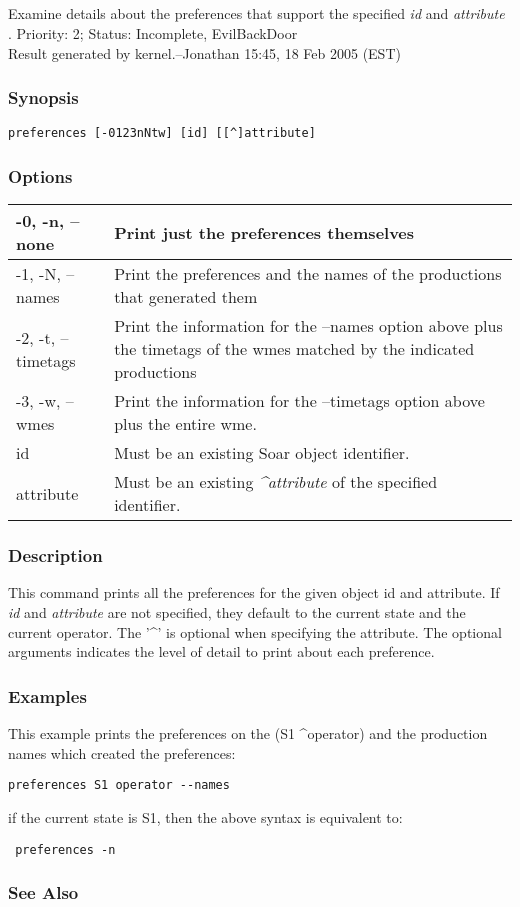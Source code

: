 \subsection{}
\label{preferences}
Examine details about the preferences that support the specified \emph{id}
 and \emph{attribute}
. 
 Priority: 2; Status: Incomplete, EvilBackDoor\\ 
Result generated by kernel.--Jonathan 15:45, 18 Feb 2005 (EST) 
\subsubsection*{Synopsis}
\begin{verbatim}
preferences [-0123nNtw] [id] [[^]attribute]
\end{verbatim}
\subsubsection*{Options}
\begin{tabular}{|l|l|}
\hline 
 -0, -n, --none  & Print just the preferences themselves  \\
 \hline 
 -1, -N, --names  & Print the preferences and the names of the productions that generated them  \\
 \hline 
 -2, -t, --timetags  & Print the information for the --names option above plus the timetags of the wmes matched by the indicated productions  \\
 \hline 
 -3, -w, --wmes  & Print the information for the --timetags option above plus the entire wme.  \\
 \hline 
id & Must be an existing Soar object identifier.  \\
 \hline 
attribute & Must be an existing \emph{\^{}attribute}
 of the specified identifier.  \\
 \hline 
\end{tabular}
\subsubsection*{Description}
 This command prints all the preferences for the given object id and attribute. If \emph{id}
 and \emph{attribute}
 are not specified, they default to the current state and the current operator. The '\^{}' is optional when specifying the attribute. The optional arguments indicates the level of detail to print about each preference. 
\subsubsection*{Examples}
 This example prints the preferences on the (S1 \^{}operator) and the production names which created the preferences: \begin{verbatim}
preferences S1 operator --names
\end{verbatim}
 if the current state is S1, then the above syntax is equivalent to: \begin{verbatim}
 preferences -n
\end{verbatim}
\subsubsection*{See Also}
